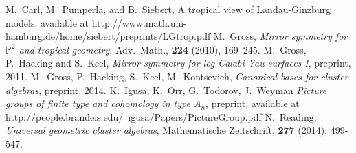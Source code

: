 \documentclass[12pt]{amsart}
\theoremstyle{remark}
\begin{document}



\begin{thebibliography}{99}
 M.~Carl, M.~Pumperla, and B.~Siebert,
A tropical view of Landau-Ginzburg models, available at
http://www.math.uni-hamburg.de/home/siebert/preprints/LGtrop.pdf
 M.~Gross,  \emph{Mirror symmetry for $\mathbb{P}^2$ 
and tropical geometry}, Adv.\ Math., {\bf 224} (2010), 169--245.
 M.~Gross, P.~Hacking and S.~Keel, \emph{Mirror
symmetry for log Calabi-Yau surfaces I}, preprint, 2011.
 M.~Gross, P.~Hacking, S.~Keel, M.~Kontsevich,
\emph{Canonical bases for cluster algebras}, preprint, 2014.
 K.~Igusa, K.~Orr, G.~Todorov, J.~Weyman \emph{Picture groups of finite type and cohomology in type $A_n$}, preprint, available at 
http://people.brandeis.edu/~igusa/Papers/PictureGroup.pdf
 N.~Reading, \emph{Universal geometric cluster algebras}, Mathematische Zeitschrift, {\bf 277 } (2014), 499-547.
\end{thebibliography}
\end{document}
